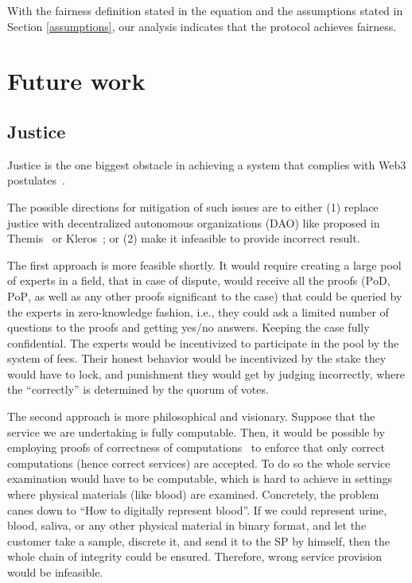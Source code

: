 \documentclass{ieeeaccess}
\begin{document}

With the fairness definition stated in the equation and the assumptions stated in Section \ref{assumptions}, our analysis indicates that the protocol achieves fairness.



\section{Future work}
\label{sec:future-work}

\subsection{Justice}\label{justice}

Justice is the one biggest obstacle in achieving a system that complies with Web3 postulates~\cite{Web3Wiki71}.

The possible directions for mitigation of such issues are to either (1) replace justice with decentralized autonomous organizations (DAO) like proposed in Themis~\cite{meng2019themis} or Kleros~\cite{lesaege2018kleros}; or (2) make it infeasible to provide incorrect result.

The first approach is more feasible shortly. It would require creating a large pool of experts in a field, that in case of dispute, would receive all the proofs ($\mathrm{PoD}$, $\mathrm{PoP}$, as well as any other proofs significant to the case) that could be queried by the experts in zero-knowledge fashion, i.e., they could ask a limited number of questions to the proofs and getting yes/no answers. Keeping the case fully confidential. The experts would be incentivized to participate in the pool by the system of fees. Their honest behavior would be incentivized by the stake they would have to lock, and punishment they would get by judging incorrectly, where the ``correctly'' is determined by the quorum of votes.

The second approach is more philosophical and visionary. Suppose that the service we are undertaking is fully computable. Then, it would be possible by employing proofs of correctness of computations~\cite{ben2013snarks} to enforce that only correct computations (hence correct services) are accepted. To do so the whole service examination would have to be computable, which is hard to achieve in settings where physical materials (like blood) are examined. Concretely, the problem canes down to ``How to digitally represent blood''. If we could represent urine, blood, saliva, or any other physical material in binary format, and let the customer take a sample, discrete it, and send it to the SP by himself, then the whole chain of integrity could be ensured. Therefore, wrong service provision would be infeasible.
\end{document}

